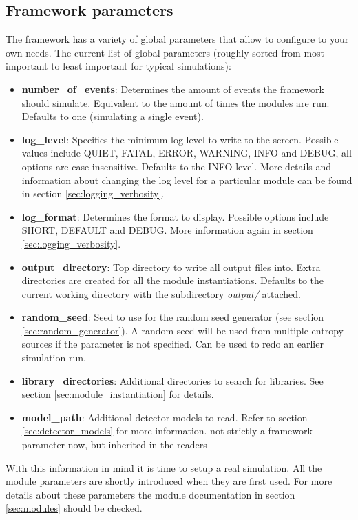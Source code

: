 \subsection{Framework parameters}
\label{sec:framework_parameters}
The framework has a variety of global parameters that allow to configure \apsq to your own needs. The current list of global parameters (roughly sorted from most important to least important for typical simulations):
\begin{itemize}
\item \textbf{number\_of\_events}: Determines the amount of events the framework should simulate. Equivalent to the amount of times the modules are run. Defaults to one (simulating a single event).
\item \textbf{log\_level}: Specifies the minimum log level to write to the screen. Possible values include QUIET, FATAL, ERROR, WARNING, INFO and DEBUG, all options are case-insensitive. Defaults to the INFO level. More details and information about changing the log level for a particular module can be found in section \ref{sec:logging_verbosity}.
\item \textbf{log\_format}: Determines the format to display. Possible options include SHORT, DEFAULT and DEBUG. More information again in section \ref{sec:logging_verbosity}.
\item \textbf{output\_directory}: Top directory to write all output files into. Extra directories are created for all the module instantiations. Defaults to the current working directory with the subdirectory \textit{output/} attached.
\item \textbf{random\_seed}: Seed to use for the random seed generator (see section \ref{sec:random_generator}). A random seed will be used from multiple entropy sources if the parameter is not specified. Can be used to redo an earlier simulation run.
\item \textbf{library\_directories}: Additional directories to search for libraries. See section \ref{sec:module_instantiation} for details.
\item \textbf{model\_path}: Additional detector models to read. Refer to section \ref{sec:detector_models} for more information. \todo not strictly a framework parameter now, but inherited in the readers \todo
\end{itemize}

With this information in mind it is time to setup a real simulation. All the module parameters are shortly introduced when they are first used. For more details about these parameters the module documentation in section \ref{sec:modules} should be checked.

